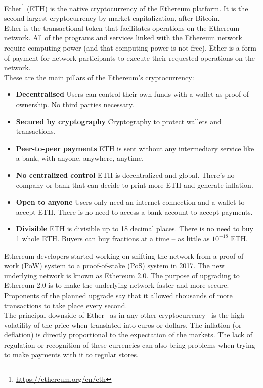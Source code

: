 \documentclass[10pt]{article}
\begin{document}
\begin{multicols}{2}
Ether\footnote{\url{https://ethereum.org/en/eth}} (ETH) is the native cryptocurrency of the Ethereum platform. It is the second-largest cryptocurrency by market capitalization, after Bitcoin.\\

Ether is the transactional token that facilitates operations on the Ethereum network. All of the programs and services linked with the Ethereum network require computing power (and that computing power is not free). Ether is a form of payment for network participants to execute their requested operations on the network.\\

These are the main pillars of the Ethereum's cryptocurrency:

\begin{itemize}
	\item \textbf{Decentralised} Users can control their own funds with a wallet as proof of ownership. No third parties necessary.
	\item \textbf{Secured by cryptography} Cryptography to protect wallets and  transactions.
	\item \textbf{Peer-to-peer payments} ETH is sent without any intermediary service like a bank, with anyone, anywhere, anytime.
	\item \textbf{No centralized control} ETH is decentralized and global. There's no company or bank that can decide to print more ETH and generate inflation.
	\item \textbf{Open to anyone} Users only need an internet connection and a wallet to accept ETH. There is no need to access a bank account to accept payments.
	\item \textbf{Divisible} ETH is divisible up to 18 decimal places. There is no need to buy 1 whole ETH. Buyers can buy fractions at a time – as little as \(10^{-18}\) ETH.
\end{itemize}

Ethereum developers started working on shifting the network from a proof-of-work (PoW) system to a proof-of-stake (PoS) system in 2017. The new underlying network is known as Ethereum 2.0. The purpose of upgrading to Ethereum 2.0 is to make the underlying network faster and more secure. Proponents of the planned upgrade say that it allowed thousands of more transactions to take place every second.\\

The principal downside of Ether --as in any other cryptocurrency-- is the high volatility of the price when translated into euros or dollars. The inflation (or deflation) is directly proportional to the expectation of the markets. The lack of regulation or recognition of these currencies can also bring problems when trying to make payments with it to regular stores.


\end{multicols}
\end{document}
